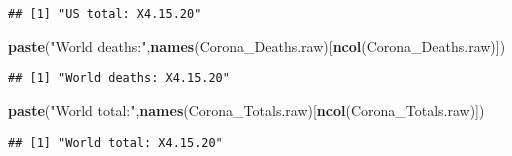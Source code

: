 \documentclass[]{article}
\newenvironment{Shaded}{\begin{snugshade}}{\end{snugshade}}
\newcommand{\KeywordTok}[1]{\textcolor[rgb]{0.13,0.29,0.53}{\textbf{{#1}}}}
\newcommand{\DataTypeTok}[1]{\textcolor[rgb]{0.13,0.29,0.53}{{#1}}}
\newcommand{\StringTok}[1]{\textcolor[rgb]{0.31,0.60,0.02}{{#1}}}
\newcommand{\NormalTok}[1]{{#1}}
\begin{document}
\begin{verbatim}
## [1] "US total: X4.15.20"
\end{verbatim}

\begin{Shaded}
\begin{Highlighting}[]
\KeywordTok{paste}\NormalTok{(}\StringTok{"World deaths:"}\NormalTok{,}\KeywordTok{names}\NormalTok{(Corona_Deaths.raw)[}\KeywordTok{ncol}\NormalTok{(Corona_Deaths.raw)])}
\end{Highlighting}
\end{Shaded}

\begin{verbatim}
## [1] "World deaths: X4.15.20"
\end{verbatim}

\begin{Shaded}
\begin{Highlighting}[]
\KeywordTok{paste}\NormalTok{(}\StringTok{"World total:"}\NormalTok{,}\KeywordTok{names}\NormalTok{(Corona_Totals.raw)[}\KeywordTok{ncol}\NormalTok{(Corona_Totals.raw)])}
\end{Highlighting}
\end{Shaded}

\begin{verbatim}
## [1] "World total: X4.15.20"
\end{verbatim}

\begin{Shaded}
\end{Shaded}
\end{document}
